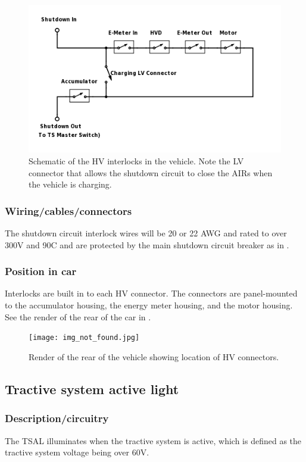 \documentclass{article}
\begin{document}
\begin{figure}[H]
\centering
\includegraphics[width = .75\textwidth]{HV-connector-schematic.png}
\caption{Schematic of the HV interlocks in the vehicle. Note the LV connector that allows the shutdown circuit to close the AIRs when the vehicle is charging.}
\label{fig:HV_connector_schematic}
\end{figure}

\subsubsection{Wiring/cables/connectors}
The shutdown circuit interlock wires will be 20 or 22 AWG and rated to over 300V and 90\textdegree C and are protected by the main shutdown circuit breaker as in . 

\subsubsection{Position in car}
Interlocks are built in to each HV connector. The connectors are panel-mounted to the accumulator housing, the energy meter housing, and the motor housing. See the render of the rear of the car in .

\begin{figure}[H]
\centering
\texttt{[image: img\_not\_found.jpg]}
\caption{Render of the rear of the vehicle showing location of HV connectors.}
\label{fig:rear_of_car}
\end{figure}

\subsection{Tractive system active light}\label{tractive_system_active_light}
\subsubsection{Description/circuitry}
The TSAL illuminates when the tractive system is active, which is defined as the tractive system voltage being over 60V.
\end{document}
